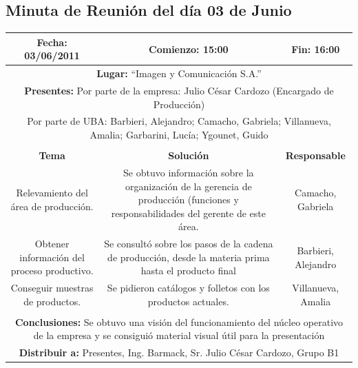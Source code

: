 \documentclass[a4paper,10pt,titlepage]{article}
\begin{document}
\newpage


\subsection{Minuta de Reuni\'on del d\'ia 03 de Junio}

\vspace{1cm}
\begin{center}
\begin{tabular}{|c|c|c|}
	\hline
	\textbf{Fecha:} 03/06/2011 &  \textbf{Comienzo:} 15:00  &  \textbf{Fin:} 16:00 \\ \hline	

	\multicolumn{3}{|c|}{\textbf{Lugar:} ``Imagen y Comunicaci\'on S.A.''} \\
	\hline \multicolumn{3}{|p{0.86\linewidth}|}{\textbf{Presentes:} Por parte de la empresa: Julio César Cardozo (Encargado de Producci\'on)} \\
	\multicolumn{3}{|p{0.86\linewidth}|}{Por parte de UBA: Barbieri, Alejandro; Camacho, Gabriela; Villanueva, Amalia; Garbarini, Luc\'ia; Ygounet, Guido } \\
	\hline
    \rowcolor[gray]{0.8} & & \\
    \hline
    \textbf{Tema} & \textbf{Solución} & \textbf{Responsable}\\
    \hline
    \multicolumn{1}{|p{0.33\linewidth}|}{Relevamiento del \'area de producci\'on.} & \multicolumn{1}{p{0.33\linewidth}|}{Se obtuvo informaci\'on sobre la organizaci\'on de la gerencia de producci\'on (funciones y responsabilidades del gerente de este \'area.} & \multicolumn{1}{p{0.20\linewidth}|}{Camacho, Gabriela}\\\hline
    \multicolumn{1}{|p{0.33\linewidth}|}{Obtener informaci\'on del proceso productivo.} & \multicolumn{1}{p{0.33\linewidth}|}{Se consult\'o sobre los pasos de la cadena de producci\'on, desde la materia prima hasta el producto final} & \multicolumn{1}{p{0.20\linewidth}|}{Barbieri, Alejandro}\\\hline
    \multicolumn{1}{|p{0.33\linewidth}|}{Conseguir muestras de productos.} & \multicolumn{1}{p{0.33\linewidth}|}{Se pidieron cat\'alogos y folletos con los productos actuales.} & \multicolumn{1}{p{0.20\linewidth}|}{Villanueva, Amalia}\\\hline
    \rowcolor[gray]{0.8} & & \\\hline
    \multicolumn{3}{|p{0.86\linewidth}|}{\textbf{Conclusiones:} Se obtuvo una visi\'on del funcionamiento del n\'ucleo operativo de la empresa y se consigui\'o material visual \'util para la presentaci\'on }\\\hline
      \multicolumn{3}{|p{0.86\linewidth}|}{\textbf{Distribuir a:} Presentes, Ing. Barmack, Sr. Julio C\'esar Cardozo, Grupo B1}\\\hline
\end{tabular} 
\end{center}
\end{document}
